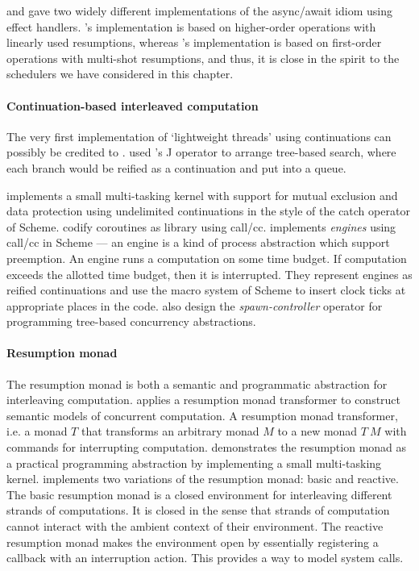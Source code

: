 \documentclass[12pt,phd,lfcs,twoside,openright,logo,leftchapter,normalheadings]{infthesis}
\theoremstyle{plain}
\theoremstyle{definition}
\begin{document}
\citet{DolanEHMSW17} and \citet{Leijen17a} gave two widely different
implementations of the async/await idiom using effect
handlers. \citeauthor{DolanEHMSW17}'s implementation is based on
higher-order operations with linearly used resumptions, whereas
\citeauthor{Leijen17a}'s implementation is based on first-order
operations with multi-shot resumptions, and thus, it is close in the
spirit to the schedulers we have considered in this chapter.

\paragraph{Continuation-based interleaved computation}
The very first implementation of `lightweight threads' using
continuations can possibly be credited to
\citet{Burstall69}. \citeauthor{Burstall69} used
\citeauthor{Landin65}'s J operator to arrange tree-based search, where
each branch would be reified as a continuation and put into a
queue.

\citet{Wand80} implements a small multi-tasking kernel with support
for mutual exclusion and data protection using undelimited
continuations in the style of the catch operator of Scheme.
\citet{HaynesFW86} codify coroutines as library using call/cc.
\citet{DybvigH89} implements \emph{engines} using call/cc in Scheme
--- an engine is a kind of process abstraction which support
preemption. An engine runs a computation on some time budget. If
computation exceeds the allotted time budget, then it is
interrupted. They represent engines as reified continuations and use
the macro system of Scheme to insert clock ticks at appropriate places
in the code. \citet{HiebD90} also design the \emph{spawn-controller}
operator for programming tree-based concurrency abstractions.

\paragraph{Resumption monad}
The resumption monad is both a semantic and programmatic abstraction
for interleaving computation. \citet{Papaspyrou01} applies a
resumption monad transformer to construct semantic models of
concurrent computation. A resumption monad transformer, i.e. a monad
$T$ that transforms an arbitrary monad $M$ to a new monad $T~M$ with
commands for interrupting computation.
%
\citet{Harrison06} demonstrates the resumption monad as a practical
programming abstraction by implementing a small multi-tasking
kernel. \citeauthor{Harrison06} implements two variations of the
resumption monad: basic and reactive. The basic resumption monad is a
closed environment for interleaving different strands of
computations. It is closed in the sense that strands of computation
cannot interact with the ambient context of their environment. The
reactive resumption monad makes the environment open by essentially
registering a callback with an interruption action. This provides a
way to model system calls.
\end{document}
